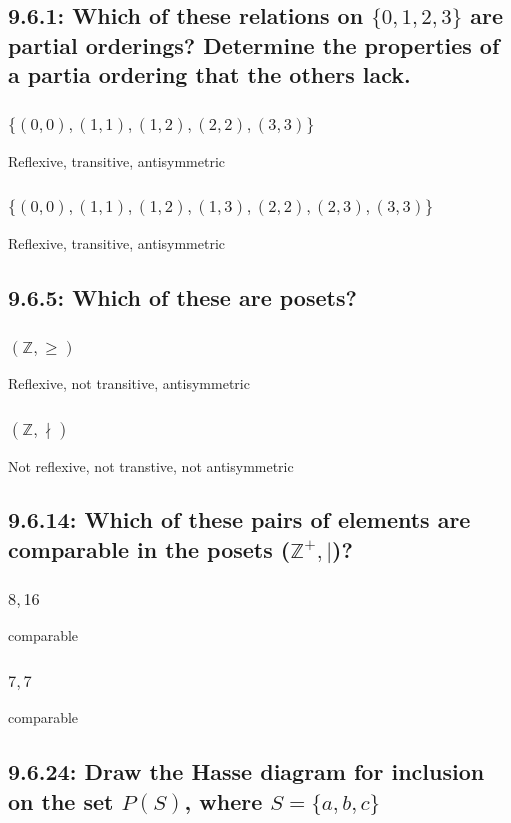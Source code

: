 \documentclass[12pt, a4paper]{report}
\begin{document}
				\subsection{9.6.1: Which of these relations on $\{0,1,2,3\}$ are partial orderings? Determine the properties of a partia ordering that the others lack.}
					\setcounter{subsubsection}{2}
					\subsubsection{$\{(0,0),(1,1),(1,2),(2,2),(3,3)\}$}
						Reflexive, transitive, antisymmetric
					\subsubsection{$\{(0,0),(1,1),(1,2),(1,3),(2,2),(2,3),(3,3)\}$}
						Reflexive, transitive, antisymmetric
				\setcounter{subsection}{4}
				\subsection{9.6.5: Which of these are posets?}
					\setcounter{subsubsection}{2}
					\subsubsection{$(\mathbb{Z}, \geq )$}
						Reflexive, not transitive, antisymmetric
					\subsubsection{$(\mathbb{Z}, \nmid )$}
						Not reflexive, not transtive, not antisymmetric
				\setcounter{subsection}{13}
				\subsection{9.6.14: Which of these pairs of elements are comparable in the posets ($\mathbb{Z}^+,|$)?}
					\setcounter{subsubsection}{2}
					\subsubsection{$8,16$}
						comparable
					\subsubsection{$7,7$}
						comparable
				\setcounter{subsection}{23}
				\subsection{9.6.24: Draw the Hasse diagram for inclusion on the set $P(S)$, where $S=\{a,b,c\}$}
				\setcounter{subsection}{31}
\end{document}
